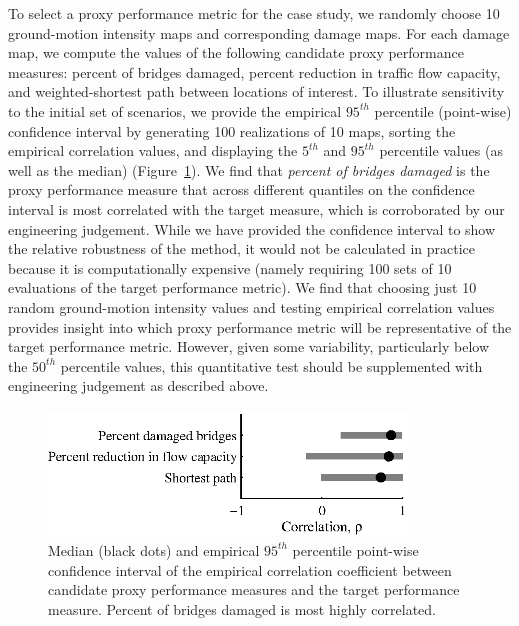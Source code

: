 To select a proxy performance metric for the case study, we randomly choose 10 ground-motion intensity maps and corresponding damage maps. For each damage map, we compute the values of the following candidate proxy performance measures: percent of bridges damaged, percent reduction in traffic flow capacity, and weighted-shortest path between locations of interest. 
To illustrate sensitivity to the initial set of scenarios, we provide the empirical $95^{th}$ percentile (point-wise) confidence interval by generating 100 realizations of 10 maps, sorting the empirical correlation values, and displaying the $5^{th}$ and $95^{th}$ percentile values (as well as the median) (Figure~\ref{fig:rhos}).  We find that \emph{percent of bridges damaged} is the proxy performance measure that across different quantiles on the confidence interval is most correlated with the target measure, which is corroborated by our engineering judgement. 
While we have provided the confidence interval to show the relative robustness of the method, it would not be calculated in practice because it is computationally expensive (namely requiring 100 sets of 10 evaluations of the target performance metric). We find that choosing just 10 random ground-motion intensity values and testing empirical correlation values provides insight into which proxy performance metric will be representative of the target performance metric. However, given some variability, particularly below the $50^{th}$ percentile values, this quantitative test should be supplemented with engineering judgement as described above. 


\begin{figure}[t!]
\centering
\includegraphics[width=3.75in]{../FIGS/subsets_rho.eps} 
\caption{Median (black dots) and empirical $95^{th}$ percentile point-wise confidence interval of the empirical correlation coefficient between candidate proxy performance measures and the target performance measure. Percent of bridges damaged is most highly correlated.}
\label{fig:rhos}
\end{figure}



